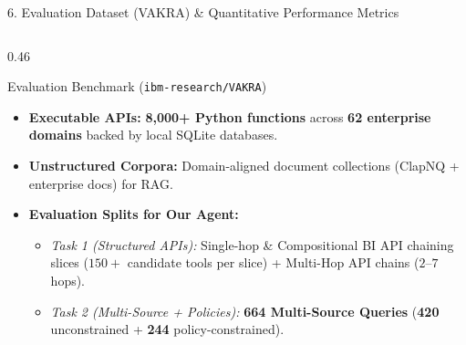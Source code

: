 \documentclass[aspectratio=169, 10pt]{beamer}
\begin{document}
\begin{frame}{6. Evaluation Dataset (VAKRA) \& Quantitative Performance Metrics}
\begin{columns}[T, onlytextwidth]
\begin{column}{0.46\textwidth}
\begin{block}{Evaluation Benchmark (\texttt{ibm-research/VAKRA})}
\footnotesize
\begin{itemize}
    \item \textbf{Executable APIs:} \textbf{8,000+ Python functions} across \textbf{62 enterprise domains} backed by local SQLite databases.
    \item \textbf{Unstructured Corpora:} Domain-aligned document collections (ClapNQ + enterprise docs) for RAG.
    \item \textbf{Evaluation Splits for Our Agent:}
    \begin{itemize}
        \footnotesize
        \item \textit{Task 1 (Structured APIs):} Single-hop \& Compositional BI API chaining slices ($150+$ candidate tools per slice) + Multi-Hop API chains ($2\text{--}7$ hops).
        \item \textit{Task 2 (Multi-Source + Policies):} \textbf{664 Multi-Source Queries} (\textbf{420} unconstrained + \textbf{244} policy-constrained).
    \end{itemize}
\end{itemize}
\end{block}
\end{column}


\end{columns}
\end{frame}
\end{document}
